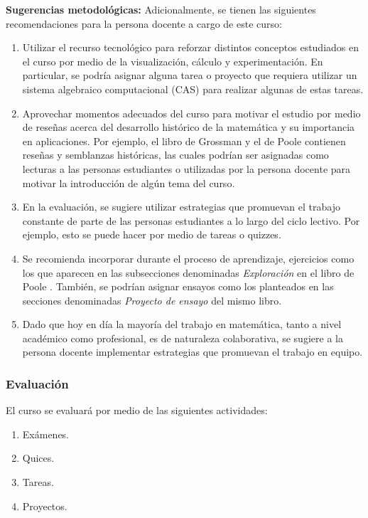\begin{refsection}
\textbf{Sugerencias metodológicas:} Adicionalmente, se tienen las siguientes recomendaciones para la persona docente a cargo de este curso:
\begin{enumerate}
    \item Utilizar el recurso tecnológico para reforzar distintos conceptos estudiados en el curso por medio de la visualización, cálculo y experimentación. En particular, se podría asignar alguna tarea o proyecto que requiera utilizar un sistema algebraico computacional (CAS) para realizar algunas de estas tareas.
    \item Aprovechar momentos adecuados del curso para motivar el estudio por medio de reseñas acerca del desarrollo histórico de la matemática y su importancia en aplicaciones. Por ejemplo, el libro de Grossman \cite{Gro19} y el de Poole \cite{Poo17} contienen reseñas y semblanzas históricas, las cuales podrían ser asignadas como lecturas a las personas estudiantes o utilizadas por la persona docente para motivar la introducción de algún tema del curso.
    \item En la evaluación, se sugiere utilizar estrategias que promuevan el trabajo constante de parte de las personas estudiantes a lo largo del ciclo lectivo. Por ejemplo, esto se puede hacer por medio de tareas o quizzes.
    \item Se recomienda incorporar durante el proceso de aprendizaje, ejercicios como los que aparecen en las subsecciones denominadas \textit{Exploración} en el libro de Poole \cite{Poo17}. También, se podrían asignar ensayos como los planteados en las secciones denominadas \textit{Proyecto de ensayo} del mismo libro.
    \item Dado que hoy en día la mayoría del trabajo en matemática, tanto a nivel académico como profesional, es de naturaleza colaborativa, se sugiere a la persona docente implementar estrategias que promuevan el trabajo en equipo.
\end{enumerate}




\subsubsection*{Evaluación}

El curso se evaluará por medio de las siguientes actividades:

\begin{enumerate}
\item Exámenes.
\item Quices.
\item Tareas.
\item Proyectos.
\end{enumerate}

\nocite{Apo84}
\nocite{Apo85} 
\nocite{Gro19}
\nocite{MM18}
\nocite{HK71}
\nocite{Cur93}
\nocite{Lan87}
\nocite{Tre17}



\printcursosbibliography
\end{refsection}
